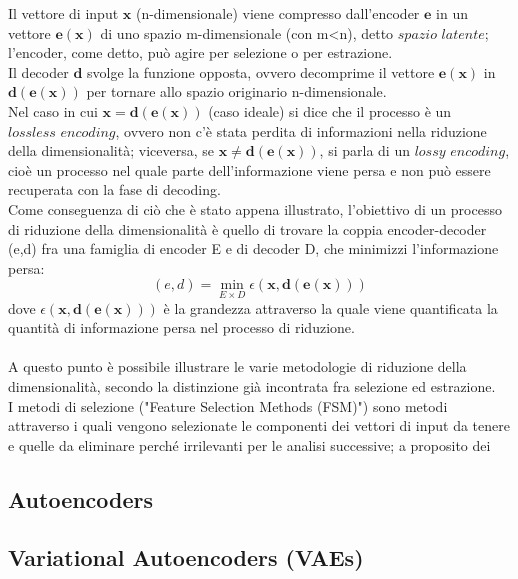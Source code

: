 Il vettore di input $\textbf{x}$ (n-dimensionale) viene compresso dall'encoder $\textbf{e}$ in un vettore $\textbf{e}(\textbf{x})$ di uno spazio m-dimensionale (con m<n), detto $\textit{spazio latente}$; l'encoder, come detto, può agire per selezione o per estrazione. \\
Il decoder $\textbf{d}$ svolge la funzione opposta, ovvero decomprime il vettore $\textbf{e}(\textbf{x})$ in $\textbf{d}(\textbf{e}(\textbf{x}))$ per tornare allo spazio originario n-dimensionale. \\
Nel caso in cui $\textbf{x} = \textbf{d}(\textbf{e}(\textbf{x}))$ (caso ideale) si dice che il processo è un $\textit{lossless encoding}$, ovvero non c'è stata perdita di informazioni nella riduzione della dimensionalità; viceversa, se $\textbf{x} \not= \textbf{d}(\textbf{e}(\textbf{x}))$, si parla di un $\textit{lossy encoding}$, cioè un processo nel quale parte dell'informazione viene persa e non può essere recuperata con la fase di decoding. \\
\newpage
Come conseguenza di ciò che è stato appena illustrato, l'obiettivo di un processo di riduzione della dimensionalità è quello di trovare la coppia encoder-decoder (e,d) fra una famiglia di encoder E e di decoder D, che minimizzi l'informazione persa:
\begin{equation}
(e,d) = \min_{E \times D} \epsilon (\textbf{x},\textbf{d}(\textbf{e}(\textbf{x})))
\end{equation}
dove $\epsilon (\textbf{x},\textbf{d}(\textbf{e}(\textbf{x})))$ è la grandezza attraverso la quale viene  quantificata la quantità di informazione persa nel processo di riduzione. \\ \\
A questo punto è possibile illustrare le varie metodologie di riduzione della dimensionalità, secondo la distinzione già incontrata fra selezione ed estrazione. \\
I metodi di selezione ("Feature Selection Methods (FSM)") sono metodi attraverso i quali vengono selezionate le componenti dei vettori di input da tenere e quelle da eliminare perché irrilevanti per le analisi successive; a proposito dei 

\newpage

\subsection{Autoencoders}
\label{autoencoders}

\newpage

\subsection{Variational Autoencoders (VAEs)}
\label{VAEs}

\newpage